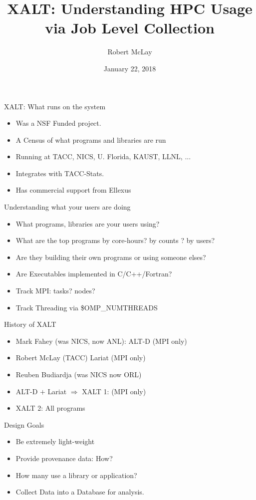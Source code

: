 \documentclass{beamer}
\begin{document}
\title[XALT]{XALT: Understanding HPC Usage via Job Level Collection}
\author{Robert McLay} 
\date{January 22, 2018} 

\frame{\titlepage} 

\begin{frame}{XALT: What runs on the system}
  \begin{itemize}
    \item Was a NSF Funded project.
    \item A Census of what programs and libraries are run
    \item Running at TACC, NICS, U. Florida, KAUST, LLNL, ...
    \item Integrates with TACC-Stats.
    \item Has commercial support from Ellexus 
  \end{itemize}
\end{frame}

\begin{frame}{Understanding what your users are doing}
  \begin{itemize}
    \item What programs, libraries are your users using?
    \item What are the top programs by core-hours? by counts ? by users?
    \item Are they building their own programs or using someone elses?
    \item Are Executables implemented in C/C++/Fortran?
    \item Track MPI: tasks? nodes?
    \item Track Threading via \$OMP\_NUMTHREADS
  \end{itemize}
\end{frame}

\begin{frame}{History of XALT}
  \begin{itemize}
    \item Mark Fahey (was NICS, now ANL): ALT-D (MPI only)
    \item Robert McLay (TACC) Lariat (MPI only)
    \item Reuben Budiardja (was NICS now ORL)
    \item ALT-D $+$ Lariat $\Rightarrow$ XALT 1: (MPI only)
    \item XALT 2: All programs
  \end{itemize}
\end{frame}

\begin{frame}{Design Goals}
  \begin{itemize}
    \item Be extremely light-weight
    \item Provide provenance data: How?
    \item How many use a library or application?
    \item Collect Data into a Database for analysis.
  \end{itemize}
\end{frame}
\end{document}
